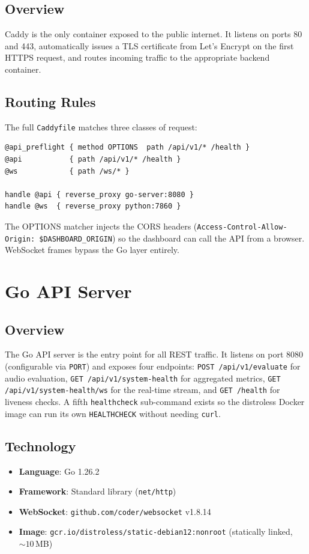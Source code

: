 \subsection{Overview}
Caddy is the only container exposed to the public internet. It listens on ports 80 and 443, automatically issues a TLS certificate from Let's Encrypt on the first HTTPS request, and routes incoming traffic to the appropriate backend container.

\subsection{Routing Rules}
The full \texttt{Caddyfile} matches three classes of request:

\begin{lstlisting}[caption={Caddy routing (excerpt from Caddyfile)}]
@api_preflight { method OPTIONS  path /api/v1/* /health }
@api           { path /api/v1/* /health }
@ws            { path /ws/* }

handle @api { reverse_proxy go-server:8080 }
handle @ws  { reverse_proxy python:7860 }
\end{lstlisting}

The OPTIONS matcher injects the CORS headers (\texttt{Access-Control-Allow-Origin: \$DASHBOARD\_ORIGIN}) so the dashboard can call the API from a browser. WebSocket frames bypass the Go layer entirely.

\section{Go API Server}
\label{sec:go_api_server}

\subsection{Overview}
The Go API server is the entry point for all REST traffic. It listens on port 8080 (configurable via \texttt{PORT}) and exposes four endpoints: \texttt{POST /api/v1/evaluate} for audio evaluation, \texttt{GET /api/v1/system-health} for aggregated metrics, \texttt{GET /api/v1/system-health/ws} for the real-time stream, and \texttt{GET /health} for liveness checks. A fifth \texttt{healthcheck} sub-command exists so the distroless Docker image can run its own \texttt{HEALTHCHECK} without needing \texttt{curl}.

\subsection{Technology}
\begin{infobox}[title=Technology Stack]
\begin{itemize}
  \item \textbf{Language}: Go 1.26.2
  \item \textbf{Framework}: Standard library (\texttt{net/http})
  \item \textbf{WebSocket}: \texttt{github.com/coder/websocket} v1.8.14
  \item \textbf{Image}: \texttt{gcr.io/distroless/static-debian12:nonroot} (statically linked, ${\sim}10$\,MB)
\end{itemize}
\end{infobox}

